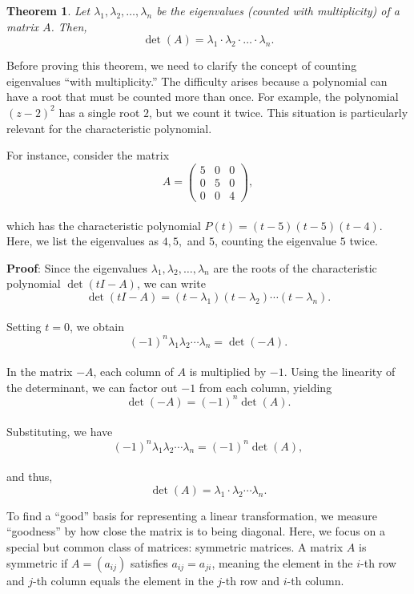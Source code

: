 \documentclass[
]{book}
\newtheorem{theorem}{Theorem}[chapter]
\theoremstyle{definition}
\theoremstyle{definition}
\theoremstyle{definition}
\theoremstyle{definition}
\theoremstyle{remark}
\begin{document}
\begin{theorem}
Let \(\lambda_1, \lambda_2, \dots, \lambda_n\) be the eigenvalues (counted with multiplicity) of a matrix \(A\). Then,\\
\[
\det(A) = \lambda_1 \cdot \lambda_2 \cdot \dots \cdot \lambda_n.
\]
\end{theorem}

Before proving this theorem, we need to clarify the concept of counting eigenvalues ``with multiplicity.'' The difficulty arises because a polynomial can have a root that must be counted more than once. For example, the polynomial \((z - 2)^2\) has a single root \(2\), but we count it twice. This situation is particularly relevant for the characteristic polynomial.

For instance, consider the matrix\\
\[
A = 
\begin{pmatrix}
5 & 0 & 0 \\
0 & 5 & 0 \\
0 & 0 & 4
\end{pmatrix},
\]\\
which has the characteristic polynomial \(P(t) = (t - 5)(t - 5)(t - 4)\). Here, we list the eigenvalues as \(4, 5,\) and \(5\), counting the eigenvalue \(5\) twice.

\textbf{Proof}: Since the eigenvalues \(\lambda_1, \lambda_2, \dots, \lambda_n\) are the roots of the characteristic polynomial \(\det(tI - A)\), we can write\\
\[
\det(tI - A) = (t - \lambda_1)(t - \lambda_2) \cdots (t - \lambda_n).
\]\\
Setting \(t = 0\), we obtain\\
\[
(-1)^n \lambda_1 \lambda_2 \cdots \lambda_n = \det(-A).
\]\\
In the matrix \(-A\), each column of \(A\) is multiplied by \(-1\). Using the linearity of the determinant, we can factor out \(-1\) from each column, yielding\\
\[
\det(-A) = (-1)^n \det(A).
\]\\
Substituting, we have\\
\[
(-1)^n \lambda_1 \lambda_2 \cdots \lambda_n = (-1)^n \det(A),
\]\\
and thus,\\
\[
\det(A) = \lambda_1 \cdot \lambda_2 \cdots \lambda_n.
\]

To find a ``good'' basis for representing a linear transformation, we measure ``goodness'' by how close the matrix is to being diagonal. Here, we focus on a special but common class of matrices: symmetric matrices. A matrix \(A\) is symmetric if \(A = (a_{ij})\) satisfies \(a_{ij} = a_{ji}\), meaning the element in the \(i\)-th row and \(j\)-th column equals the element in the \(j\)-th row and \(i\)-th column.
\end{document}
